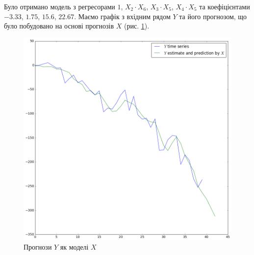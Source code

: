Було отримано модель з регресорами $\mathcal{1}$,
$X_2 \cdot X_6$, $X_3 \cdot X_5$, $X_4 \cdot X_5$
та коефіцієнтами $-3.33$, $1.75$, $15.6$, $22.67$.
Маємо графік з вхідним рядом $Y$
та його прогнозом, що було побудовано на основі прогнозів $X$
(рис. \ref{fig:y:forecast:x}).

\begin{figure}[h!]
  \centering
  \includegraphics[width=\textwidth]{Coursework2_files/Coursework2_13_0.png}
  \caption{Прогнози $Y$ як моделі $X$}
  \label{fig:y:forecast:x}
\end{figure}
